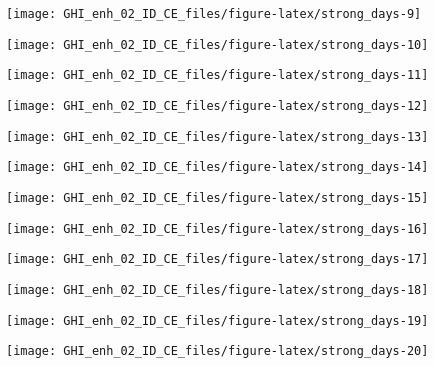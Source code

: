 \documentclass[
  10pt,
  a4paper,oneside]{article}
\begin{document}
\begin{center}\texttt{[image: GHI\_enh\_02\_ID\_CE\_files/figure-latex/strong\_days-9]} \end{center}

\begin{center}\texttt{[image: GHI\_enh\_02\_ID\_CE\_files/figure-latex/strong\_days-10]} \end{center}

\begin{center}\texttt{[image: GHI\_enh\_02\_ID\_CE\_files/figure-latex/strong\_days-11]} \end{center}

\begin{center}\texttt{[image: GHI\_enh\_02\_ID\_CE\_files/figure-latex/strong\_days-12]} \end{center}

\begin{center}\texttt{[image: GHI\_enh\_02\_ID\_CE\_files/figure-latex/strong\_days-13]} \end{center}

\begin{center}\texttt{[image: GHI\_enh\_02\_ID\_CE\_files/figure-latex/strong\_days-14]} \end{center}

\begin{center}\texttt{[image: GHI\_enh\_02\_ID\_CE\_files/figure-latex/strong\_days-15]} \end{center}

\begin{center}\texttt{[image: GHI\_enh\_02\_ID\_CE\_files/figure-latex/strong\_days-16]} \end{center}

\begin{center}\texttt{[image: GHI\_enh\_02\_ID\_CE\_files/figure-latex/strong\_days-17]} \end{center}

\begin{center}\texttt{[image: GHI\_enh\_02\_ID\_CE\_files/figure-latex/strong\_days-18]} \end{center}

\begin{center}\texttt{[image: GHI\_enh\_02\_ID\_CE\_files/figure-latex/strong\_days-19]} \end{center}

\begin{center}\texttt{[image: GHI\_enh\_02\_ID\_CE\_files/figure-latex/strong\_days-20]} \end{center}
\end{document}
